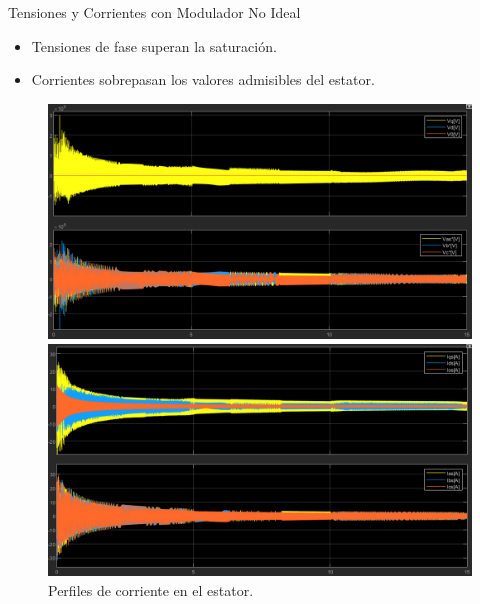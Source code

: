 \documentclass[12pt]{beamer}
\begin{document}
\begin{frame}{Tensiones y Corrientes con Modulador No Ideal}
    \begin{itemize}
        \item Tensiones de fase superan la saturación.
        \item Corrientes sobrepasan los valores admisibles del estator.
    \end{itemize}
    \begin{figure}
        \centering
        \begin{minipage}{0.48\textwidth}
            \includegraphics[width=\textwidth]{Imagenes/Consignas_Tensiones_ModuladorTNL.png}
            \caption{Consignas de tensión en coordenadas absolutas y virtuales.}
        \end{minipage}
        \hfill
        \begin{minipage}{0.48\textwidth}
            \includegraphics[width=\textwidth]{Imagenes/Corrientes_ModuladorTNL.png}
            \caption{Perfiles de corriente en el estator.}
        \end{minipage}
    \end{figure}
\end{frame}
\end{document}
